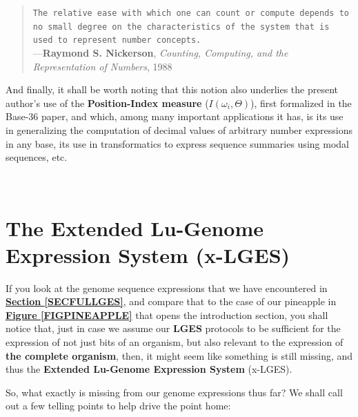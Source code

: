\documentclass[a4paper, 18pt]{book} %
\begin{document}
\begin{center}
{\begin{minipage}{0.9\textwidth}
\begin{quotation}
\noindent \texttt{The relative ease with which one can count or compute depends to no small degree on the characteristics of the system that is used to represent number concepts.}\\

\hspace*{\fill} ---\textbf{Raymond S. Nickerson}, \textit{Counting, Computing, and the Representation of Numbers}, 1988\cite{nickerson1988counting}
\end{quotation}

And finally, it shall be worth noting that this notion also underlies the present author's use of the \textbf{Position-Index measure} ($I(\omega_i, \Theta)$), first formalized in the Base-36 paper\cite{base36paper}, and which, among many important applications it has, is its use in generalizing the computation of decimal values of arbitrary number expressions in any base, its use in transformatics to express sequence summaries using modal sequences\cite{transformatics}, etc.

\end{minipage}}
\\
\end{center}


\section{The Extended Lu-Genome Expression System (x-LGES)}
\label{SECxLGES}

If you look at the genome sequence expressions that we have encountered in \textbf{\hyperref[SECFULLGES]{Section \ref{SECFULLGES}}}, and compare that to the case of our pineapple in \textbf{\hyperref[FIGPINEAPPLE]{Figure \ref{FIGPINEAPPLE}}} that opens the introduction section, you shall notice that, just in case we assume our \textbf{LGES} protocols to be sufficient for the expression of not just bits of an organism, but also relevant to the expression of \textbf{the complete organism}, then, it might seem like something is still missing, and thus the \textbf{Extended Lu-Genome Expression System} (x-LGES).


So, what exactly is missing from our genome expressions thus far? We shall call out a few telling points to help drive the point home:
\end{document}
